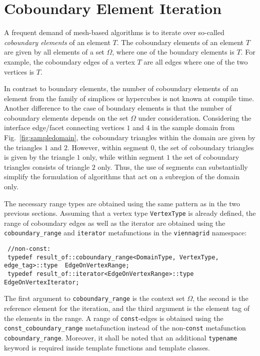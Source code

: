 \section{Coboundary Element Iteration}
A frequent demand of mesh-based algorithms is to iterate over so-called \emph{coboundary elements} of an element $T$.
The coboundary elements of an element $T$ are given by all elements of a set $\Omega$, where one of the boundary elements is $T$.
For example, the coboundary edges of a vertex $T$ are all edges where one of the two vertices is $T$.

In contrast to boundary elements, the number of coboundary elements of an element from the family of simplices or hypercubes is not known at compile time.
Another difference to the case of boundary elements is that the number of coboundary elements depends on the set $\Omega$ under consideration.
Considering the interface edge/facet connecting vertices $1$ and $4$ in the sample domain from Fig.~\ref{fig:sampledomain}, the coboundary triangles within the domain are given by the triangles $1$ and $2$.
However, within segment $0$, the set of coboundary triangles is given by the triangle $1$ only, while within segment $1$ the set of coboundary triangles consists of triangle $2$ only.
Thus, the use of segments can substantially simplify the formulation of algorithms that act on a subregion of the domain only.

The necessary range types are obtained using the same pattern as in the two previous sections.
Assuming that a vertex type \lstinline|VertexType| is already defined, the range of coboundary edges as well as the iterator are obtained
using the \lstinline|coboundary_range| and \lstinline|iterator| metafunctions in the \lstinline|viennagrid| namespace:
\begin{lstlisting}
 //non-const:
 typedef result_of::coboundary_range<DomainType, VertexType, edge_tag>::type  EdgeOnVertexRange;
 typedef result_of::iterator<EdgeOnVertexRange>::type EdgeOnVertexIterator;
\end{lstlisting}
The first argument to \lstinline|coboundary_range| is the context set $\Omega$, the second is the reference element for the iteration, and the third argument is the element tag of the elements in the range.
A range of \lstinline|const|-edges is obtained using the \lstinline|const_coboundary_range| metafunction instead of the non-\lstinline|const| metafunction \lstinline|coboundary_range|.
Moreover, it shall be noted that an additional \lstinline|typename| keyword is required inside template functions and template classes.


